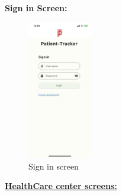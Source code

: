 \documentclass[12pt]{article}
\begin{document}
			\textbf{Sign in Screen:}
				\begin{figure}[!h]
					\centering
					\includegraphics[width=0.25\textwidth]{SignIn.png}
					\caption{Sign in screen}
					\label{Sign in  screen}
				\end{figure}
			\newpage
		\textbf{\underline{HealthCare center screens:}}
\end{document}
